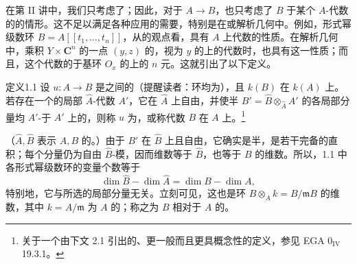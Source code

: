 在第 II 讲中，我们只考虑了；因此，对于 $A\to B$，也只考虑了 $B$ 于某个 $A$-代数的的情形。这不足以满足各种应用的需要，特别是在或解析几何中。例如，形式幂级数环 $B=A[[t_1,\ldots,t_n]]$，从的观点看，具有 $A$ 上代数的性质。在解析几何中，乘积 $Y\times\mathbf C^n$ 的一点 $(y,z)$ 的，视为 $y$ 的上的代数时，也具有这一性质；而且，这个代数的于基环 $O_x$ 的上的 $n$ 元。这就引出了以下定义。
\begin{SGAresult}{定义}{1.1}
设 $u:A\to B$ 是之间的（提醒读者：环均为），且 $k(B)$ 在 $k(A)$ 上。若存在一个的局部 $\widehat A$-代数 $A'$，它在 $\widehat A$ 上自由，并使半 $B'=\widehat B\otimes_{\widehat A}A'$ 的各局部分量均 $A'$-于 $A'$ 上的，则称 $u$ 为，或称代数 $B$ 在 $A$ 上。\footnote{关于一个由下文 2.1 引出的、更一般而且更具概念性的定义，参见 EGA $0_{\mathrm{IV}}$ 19.3.1。}
\end{SGAresult}
（$\widehat A,\widehat B$ 表示 $A,B$ 的。）由于 $B'$ 在 $\widehat B$ 上且自由，它确实是半，是若干完备的直积；每个分量仍为自由 $\widehat B$-模，因而维数等于 $\widehat B$，也等于 $B$ 的维数。所以，1.1 中各形式幂级数环的变量个数等于
\[\dim\widehat B-\dim\widehat A=\dim B-\dim A,\]
特别地，它与所选的局部分量无关。立刻可见，这也是环 $B\otimes_A k=B/\mathfrak mB$ 的维数，其中 $k=A/\mathfrak m$ 为 $A$ 的；称之为 $B$ 相对于 $A$ 的。
